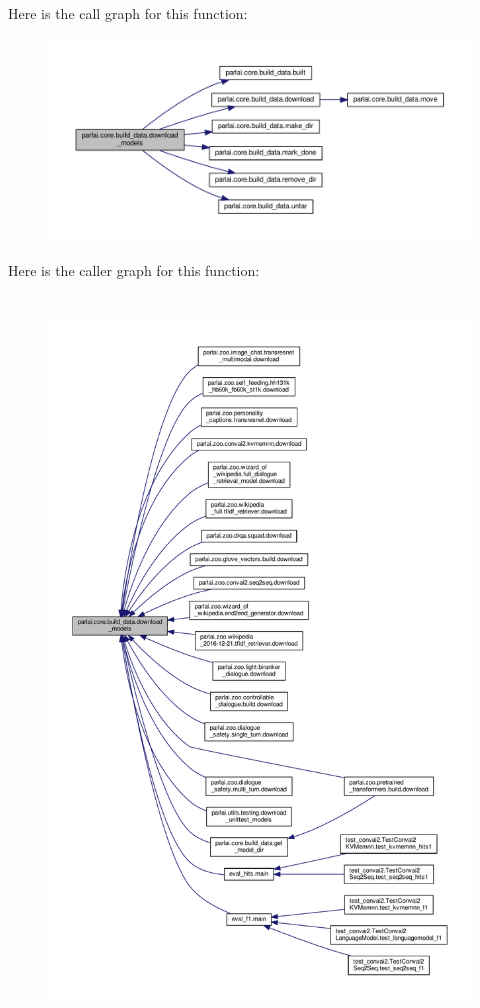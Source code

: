Here is the call graph for this function\+:
\nopagebreak
\begin{figure}[H]
\begin{center}
\leavevmode
\includegraphics[width=350pt]{namespaceparlai_1_1core_1_1build__data_ab697f23f05d3e36d7979fe5e0ed7911e_cgraph}
\end{center}
\end{figure}
Here is the caller graph for this function\+:
\nopagebreak
\begin{figure}[H]
\begin{center}
\leavevmode
\includegraphics[height=550pt]{namespaceparlai_1_1core_1_1build__data_ab697f23f05d3e36d7979fe5e0ed7911e_icgraph}
\end{center}
\end{figure}
